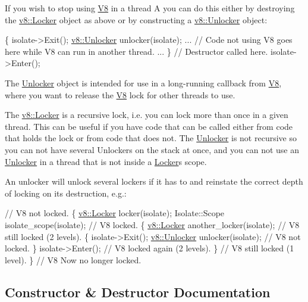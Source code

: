 If you wish to stop using \hyperlink{classv8_1_1V8}{V8} in a thread A you can do this either by destroying the \hyperlink{classv8_1_1Locker}{v8\+::\+Locker} object as above or by constructing a \hyperlink{classv8_1_1Unlocker}{v8\+::\+Unlocker} object\+:


\begin{DoxyCode}
\{
  isolate->Exit();
  \hyperlink{classv8_1_1Unlocker}{v8::Unlocker} unlocker(isolate);
  ...
  \textcolor{comment}{// Code not using V8 goes here while V8 can run in another thread.}
  ...
\} \textcolor{comment}{// Destructor called here.}
isolate->Enter();
\end{DoxyCode}


The \hyperlink{classv8_1_1Unlocker}{Unlocker} object is intended for use in a long-\/running callback from \hyperlink{classv8_1_1V8}{V8}, where you want to release the \hyperlink{classv8_1_1V8}{V8} lock for other threads to use.

The \hyperlink{classv8_1_1Locker}{v8\+::\+Locker} is a recursive lock, i.\+e. you can lock more than once in a given thread. This can be useful if you have code that can be called either from code that holds the lock or from code that does not. The \hyperlink{classv8_1_1Unlocker}{Unlocker} is not recursive so you can not have several Unlockers on the stack at once, and you can not use an \hyperlink{classv8_1_1Unlocker}{Unlocker} in a thread that is not inside a \hyperlink{classv8_1_1Locker}{Locker}\textquotesingle{}s scope.

An unlocker will unlock several lockers if it has to and reinstate the correct depth of locking on its destruction, e.\+g.\+:


\begin{DoxyCode}
\textcolor{comment}{// V8 not locked.}
\{
  \hyperlink{classv8_1_1Locker}{v8::Locker} locker(isolate);
  Isolate::Scope isolate\_scope(isolate);
  \textcolor{comment}{// V8 locked.}
  \{
    \hyperlink{classv8_1_1Locker}{v8::Locker} another\_locker(isolate);
    \textcolor{comment}{// V8 still locked (2 levels).}
    \{
      isolate->Exit();
      \hyperlink{classv8_1_1Unlocker}{v8::Unlocker} unlocker(isolate);
      \textcolor{comment}{// V8 not locked.}
    \}
    isolate->Enter();
    \textcolor{comment}{// V8 locked again (2 levels).}
  \}
  \textcolor{comment}{// V8 still locked (1 level).}
\}
\textcolor{comment}{// V8 Now no longer locked.}
\end{DoxyCode}
 

\subsection{Constructor \& Destructor Documentation}
\hypertarget{classv8_1_1Unlocker_a2faeb117d7308b65ac85fdad390e4c1f}{}
